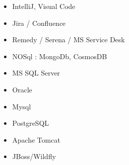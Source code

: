     \begin{cvcolumns}
	{\begin{itemize}
            \item IntelliJ, Visual Code
            \item Jira / Confluence
            \item Remedy / Serena / MS Service Desk
    \end{itemize}
    }
	{\begin{itemize}
            \item NOSql : MongoDb, CosmosDB
            \item MS SQL Server
            \item Oracle
            \item Mysql
            \item PostgreSQL
    \end{itemize}}
 \end{cvcolumns}
   \begin{cvcolumns}
	{\begin{itemize}
            \item Apache Tomcat
            \item JBoss/Wildfly
    \end{itemize}}
 \end{cvcolumns}
